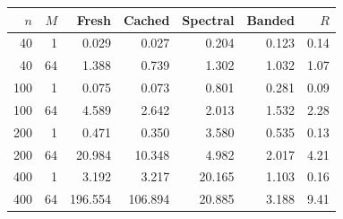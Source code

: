 \begin{tabular}{rrrrrrr}
\toprule
$n$ & $M$ & Fresh & Cached & Spectral & Banded & $R$ \\
\midrule
40 & 1 & 0.029 & 0.027 & 0.204 & 0.123 & 0.14 \\
40 & 64 & 1.388 & 0.739 & 1.302 & 1.032 & 1.07 \\
100 & 1 & 0.075 & 0.073 & 0.801 & 0.281 & 0.09 \\
100 & 64 & 4.589 & 2.642 & 2.013 & 1.532 & 2.28 \\
200 & 1 & 0.471 & 0.350 & 3.580 & 0.535 & 0.13 \\
200 & 64 & 20.984 & 10.348 & 4.982 & 2.017 & 4.21 \\
400 & 1 & 3.192 & 3.217 & 20.165 & 1.103 & 0.16 \\
400 & 64 & 196.554 & 106.894 & 20.885 & 3.188 & 9.41 \\
\bottomrule
\end{tabular}
